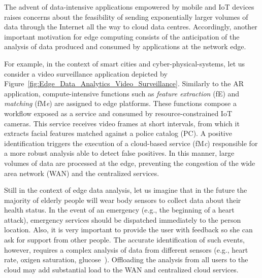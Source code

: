 The advent of data-intensive applications empowered by mobile and IoT devices raises concerns about the feasibility of sending exponentially larger volumes of data through the Internet all the way to cloud data centres. Accordingly, another important motivation for edge computing consists of the anticipation of the analysis of data produced and consumed by applications at the network edge. 


For example, in the context of smart cities and cyber-physical-systems, let us consider a video surveillance application depicted by Figure~\ref{fig:Edge_Data_Analytics_Video_Surveillance}. Similarly to the AR application, compute-intensive functions such as \textit{feature extraction} (fE) and \textit{matching} (fM\textit{e}) are assigned to edge platforms.
These functions compose a workflow exposed as a service and consumed by resource-constrained IoT cameras. This service receives video frames at short intervals, from which it extracts facial features matched against a police catalog (PC). A positive identification triggers the execution of a cloud-based service (fM\textit{c}) responsible for a more robust analysis able to detect false positives. In this manner, large volumes of data are processed at the edge, preventing the congestion of the wide area network (WAN) and the centralized services.



Still in the context of edge data analysis, 
let us imagine that in the future the majority of elderly people will wear body sensors to collect data about their health status. In the event of an emergency (e.g., the beginning of a heart attack), emergency services should be dispatched immediately to the person location. Also, it is very important to provide the user with feedback so she can ask for support from other people.
The accurate identification of such events, however, requires a complex analysis of data from different sensors (e.g., heart rate, oxigen saturation, glucose~\cite{Li:2017}). Offloading the analysis from all users to the cloud may add substantial load to the WAN and centralized cloud services. %

